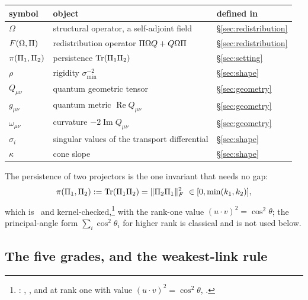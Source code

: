 \begin{center}
\small
\begin{tabularx}{\textwidth}{@{}l l >{\raggedright\arraybackslash}X@{}}
\toprule
symbol & object & defined in \\
\midrule
$\Omega$ & structural operator, a self-adjoint field & \S\ref{sec:redistribution} \\
$F(\Omega,\Pi)$ & redistribution operator $\Pi\Omega Q+Q\Omega\Pi$ & \S\ref{sec:redistribution} \\
$\pi(\Pi_1,\Pi_2)$ & persistence $\operatorname{Tr}(\Pi_1\Pi_2)$ & \S\ref{sec:setting} \\
$\rho$ & rigidity $\sigma_{\min}^{-2}$ & \S\ref{sec:shape} \\
$Q_{\mu\nu}$ & quantum geometric tensor & \S\ref{sec:geometry} \\
$g_{\mu\nu}$ & quantum metric $\operatorname{Re}Q_{\mu\nu}$ & \S\ref{sec:geometry} \\
$\omega_{\mu\nu}$ & curvature $-2\operatorname{Im}Q_{\mu\nu}$ & \S\ref{sec:geometry} \\
$\sigma_i$ & singular values of the transport differential & \S\ref{sec:shape} \\
$\kappa$ & cone slope & \S\ref{sec:shape} \\
\bottomrule
\end{tabularx}
\end{center}

The persistence of two projectors is the one invariant that needs no gap:
\begin{equation}\label{eq:persistence}
   \pi(\PP_1,\PP_2):=\Tr(\PP_1\PP_2)=\norm{\PP_2\PP_1}_F^2\ \in[0,\min(k_1,k_2)],
\end{equation}
which is \T\ and kernel-checked,\footnote{:
, , and at rank one with value
$(u\cdot v)^2=\cos^2\theta$, .} with the rank-one value
$(u\cdot v)^2=\cos^2\theta$; the principal-angle form $\sum_i\cos^2\theta_i$ for higher rank is
classical \Cc{} and is not used below.

\subsection{The five grades, and the weakest-link rule}

